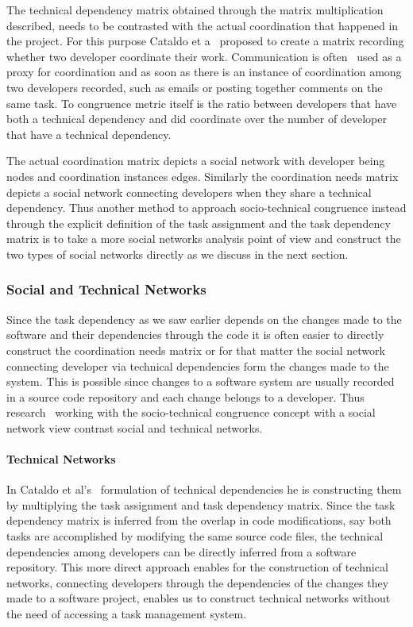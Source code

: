 The technical dependency matrix obtained through the matrix multiplication described, needs to be contrasted with the actual coordination that happened in the project.
For this purpose Cataldo et a~\cite{cataldo:cscw:2006} proposed to create a matrix recording whether two developer coordinate their work.
Communication is often~\cite{cataldo:cscw:2006,kwan:tse:2011,valetto:msr:2007,ducheneaut:cscw:2005,ehrlich:stc:2008,wolf:icse:2009} used as a proxy for coordination and as soon as there is an instance of coordination among two developers recorded, such as emails or posting together comments on the same task.
To congruence metric itself is the ratio between developers that have both a technical dependency and did coordinate over the number of developer that have a technical dependency.

The actual coordination matrix depicts a social network with developer being nodes and coordination instances edges.
Similarly the coordination needs matrix depicts a social network connecting developers when they share a technical dependency.
Thus another method to approach socio-technical congruence instead through the explicit definition of the task assignment and the task dependency matrix is to take a more social networks analysis point of view and construct the two types of social networks directly as we discuss in the next section.

\subsubsection{Social and Technical Networks}
Since the task dependency as we saw earlier depends on the changes made to the software and their dependencies through the code it is often easier to directly construct the coordination needs matrix or for that matter the social network connecting developer via technical dependencies form the changes made to the system.
This is possible since changes to a software system are usually recorded in a source code repository and each change belongs to a developer.
Thus research~\cite{cataldo:cscw:2006,kwan:tse:2011,valetto:msr:2007,ducheneaut:cscw:2005,ehrlich:stc:2008} working with the socio-technical congruence concept with a social network view contrast social and technical networks.

\paragraph{Technical Networks}
In Cataldo et al's~\cite{cataldo:cscw:2006} formulation of technical dependencies he is constructing them by multiplying the task assignment and task dependency matrix.
Since the task dependency matrix is inferred from the overlap in code modifications, say both tasks are accomplished by modifying the same source code files, the technical dependencies among developers can be directly inferred from a software repository.
This more direct approach enables for the construction of technical networks, connecting developers through the dependencies of the changes they made to a software project, enables us to construct technical networks without the need of accessing a task management system.

